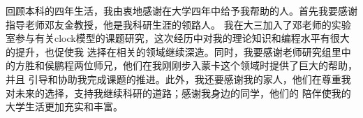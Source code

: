 
\begin{acknowledgements}
回顾本科的四年生活，我由衷地感谢在大学四年中给予我帮助的人。首先我要感谢指导老师邓友金教授，他是我科研生涯的领路人。
我在大三加入了邓老师的实验室参与有关clock模型的课题研究，这次经历中对我的理论知识和编程水平有很大的提升，也促使我
选择在相关的领域继续深造。同时，我要感谢老师研究组里中的方胜和侯鹏程两位师兄，他们在我刚刚步入蒙卡这个领域时提供了巨大的帮助，并且
引导和协助我完成课题的推进。此外，我还要感谢我的家人，他们在尊重我对未来的选择，支持我继续科研的道路；感谢我身边的同学，他们的
陪伴使我的大学生活更加充实和丰富。

\end{acknowledgements}
